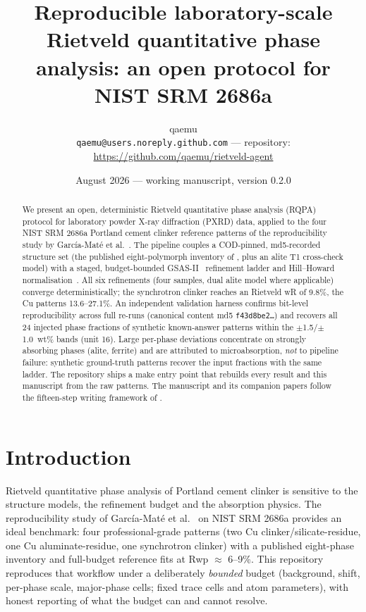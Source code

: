 \documentclass[11pt,a4paper]{article}
\title{\textbf{Reproducible laboratory-scale Rietveld quantitative phase
analysis: an open protocol for NIST SRM 2686a}}
\author{qaemu\\
\small \texttt{qaemu@users.noreply.github.com} --- repository:
\url{https://github.com/qaemu/rietveld-agent}}
\date{August 2026 --- working manuscript, version 0.2.0}
\begin{document}
\maketitle

\begin{abstract}
\noindent We present an open, deterministic Rietveld quantitative phase
analysis (RQPA) protocol for laboratory powder X-ray diffraction (PXRD)
data, applied to the four NIST SRM 2686a Portland cement clinker
reference patterns of the reproducibility study by
Garc\'ia-Mat\'e et al.~\cite{garcia-mate2024srms}. The pipeline couples a
COD-pinned, md5-recorded structure set (the published eight-polymorph
inventory of \cite{garcia-mate2024srms}, plus an alite T1 cross-check
model) with a staged, budget-bounded GSAS-II~\cite{toby2013gsas2}
refinement ladder and Hill--Howard normalisation~\cite{hill1987normalization}.
All six refinements (four samples, dual alite model where applicable)
converge deterministically; the synchrotron clinker reaches an
Rietveld wR of 9.8\%, the Cu patterns 13.6--27.1\%. An independent
validation harness confirms bit-level reproducibility across full
re-runs (canonical content md5 \texttt{f43d8be2\ldots}) and recovers
all 24 injected phase fractions of synthetic known-answer patterns
within the $\pm$1.5/$\pm$1.0~wt\% bands (unit 16). Large per-phase
deviations concentrate on strongly absorbing phases (alite, ferrite) and
are attributed to microabsorption, \emph{not} to pipeline failure:
synthetic ground-truth patterns recover the input fractions with the same
ladder. The repository ships a $\mathrm{make}$ entry point that rebuilds
every result and this manuscript from the raw patterns. The manuscript
and its companion papers follow the fifteen-step writing framework of
\cite{drake2025fifteen}.
\end{abstract}

\section{Introduction}
Rietveld quantitative phase analysis of Portland cement clinker is
sensitive to the structure models, the refinement budget and the
absorption physics. The reproducibility study of
Garc\'ia-Mat\'e et al.~\cite{garcia-mate2024srms} on NIST SRM 2686a
provides an ideal benchmark: four professional-grade patterns (two Cu
clinker/silicate-residue, one Cu aluminate-residue, one synchrotron
clinker) with a published eight-phase inventory and full-budget
reference fits at Rwp $\approx$ 6--9\%. This repository reproduces that
workflow under a deliberately \emph{bounded} budget (background, shift,
per-phase scale, major-phase cells; fixed trace cells and atom
parameters), with honest reporting of what the budget can and cannot
resolve.
\end{document}
